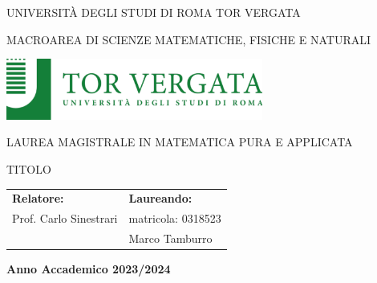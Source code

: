 \thispagestyle{empty}
\begin{center}
	
	{\LARGE UNIVERSITÀ DEGLI STUDI DI ROMA TOR VERGATA
	}
	\vspace{\baselineskip}
	
	{\Large MACROAREA DI SCIENZE MATEMATICHE, FISICHE E NATURALI}
	
	\vspace{1cm}
	
	\includegraphics[height=2cm]{logo.pdf}\\
	
	\vspace{1cm}
	
	{\Large 
		LAUREA MAGISTRALE IN MATEMATICA PURA E APPLICATA
		\vspace{2\baselineskip}
		
		\vspace{1cm}\vspace{1cm}
		
		
		TITOLO\vspace{0.5\baselineskip}\\
		\textbf{\Large{\ttl}} %
		\vspace{2\baselineskip}
		
		
		\vspace{1cm}
		\begin{tabular}{m{8cm} m{8cm}}
			
			\textbf{Relatore:}%
			&\textbf{Laureando:}  %
			\\
			Prof. %
			Carlo Sinestrari %
			&matricola: 0318523 %
			\\
			&Marco Tamburro %
			\\
			
			
		\end{tabular}
		\vspace{5\baselineskip}
		
		\textbf{Anno Accademico 2023/2024} %
	}
	
\end{center}
\restoregeometry
\newpage